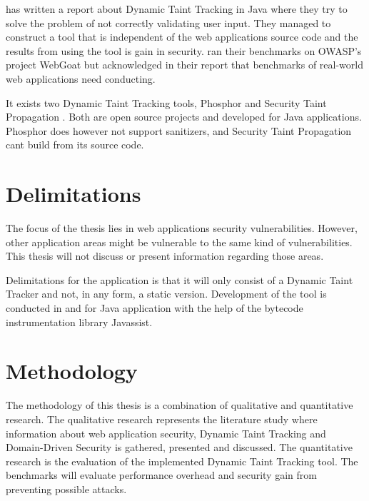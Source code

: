 \textcite{Haldar} has written a report about Dynamic Taint Tracking in Java where they try to solve the problem of not correctly validating user input. They managed to construct a tool that is independent of the web applications source code and the results from using the tool is gain in security. \textcite{Haldar} ran their benchmarks on OWASP’s project WebGoat \parencite{webgoat} but acknowledged in their report that benchmarks of real-world web applications need conducting.

It exists two Dynamic Taint Tracking tools, Phosphor \parencite{phosphor} and Security Taint Propagation \parencite{securityTaint}. Both are open source projects and developed for Java applications. Phosphor does however not support sanitizers, and Security Taint Propagation cant build from its source code.

\section{Delimitations}
\label{Delimitations}
The focus of the thesis lies in web applications security vulnerabilities. However, other application areas might be vulnerable to the same kind of vulnerabilities.  This thesis will not discuss or present information regarding those areas.

Delimitations for the application is that it will only consist of a Dynamic Taint Tracker and not, in any form, a static version. Development of the tool is conducted in and for Java application with the help of the bytecode instrumentation library Javassist.


\section{Methodology}
\label{Methodology}
The methodology of this thesis is a combination of qualitative and quantitative research. The qualitative research represents the literature study where information about web application security, Dynamic Taint Tracking and Domain-Driven Security is gathered, presented and discussed. The quantitative research is the evaluation of the implemented Dynamic Taint Tracking tool. The benchmarks will evaluate performance overhead and security gain from preventing possible attacks.
